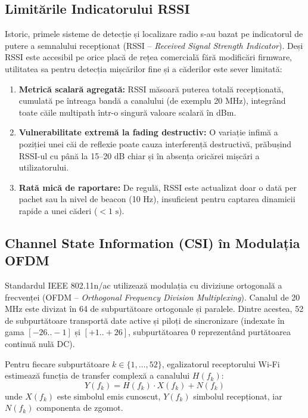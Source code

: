 \subsection{Limitările Indicatorului RSSI}
Istoric, primele sisteme de detecție și localizare radio s-au bazat pe indicatorul de putere a semnalului recepționat (RSSI -- \textit{Received Signal Strength Indicator}). Deși RSSI este accesibil pe orice placă de rețea comercială fără modificări firmware, utilitatea sa pentru detecția mișcărilor fine și a căderilor este sever limitată:
\begin{enumerate}
    \item \textbf{Metrică scalară agregată:} RSSI măsoară puterea totală recepționată, cumulată pe întreaga bandă a canalului (de exemplu 20 MHz), integrând toate căile multipath într-o singură valoare scalară în dBm.
    \item \textbf{Vulnerabilitate extremă la fading destructiv:} O variație infimă a poziției unei căi de reflexie poate cauza interferență destructivă, prăbușind RSSI-ul cu până la 15--20 dB chiar și în absența oricărei mișcări a utilizatorului.
    \item \textbf{Rată mică de raportare:} De regulă, RSSI este actualizat doar o dată per pachet sau la nivel de beacon (10 Hz), insuficient pentru captarea dinamicii rapide a unei căderi ($<1\text{ s}$).
\end{enumerate}

\subsection{Channel State Information (CSI) în Modulația OFDM}
Standardul IEEE 802.11n/ac utilizează modulația cu diviziune ortogonală a frecvenței (OFDM -- \textit{Orthogonal Frequency Division Multiplexing}). Canalul de 20 MHz este divizat în 64 de subpurtătoare ortogonale și paralele. Dintre acestea, 52 de subpurtătoare transportă date active și piloți de sincronizare (indexate în gama $[-26..-1]$ și $[+1..+26]$, subpurtătoarea 0 reprezentând purtătoarea continuă nulă DC).

Pentru fiecare subpurtătoare $k \in \{1, \dots, 52\}$, egalizatorul receptorului Wi-Fi estimează funcția de transfer complexă a canalului $H(f_k)$:
\begin{equation}
    Y(f_k) = H(f_k) \cdot X(f_k) + N(f_k)
\end{equation}
unde $X(f_k)$ este simbolul emis cunoscut, $Y(f_k)$ simbolul recepționat, iar $N(f_k)$ componenta de zgomot.

